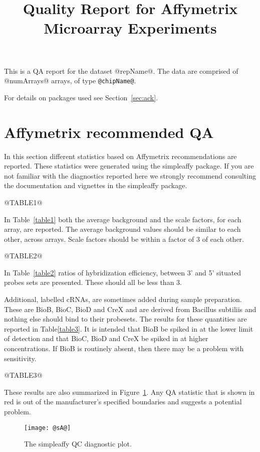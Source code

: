 \documentclass[11pt]{article}
\newcommand{\Rpackage}[1]{{\textsf{#1}}}
\begin{document}
\title{Quality Report for Affymetrix Microarray Experiments}

\maketitle

This is a QA report for the dataset @repName@.
The data are comprised of @numArrays@ arrays, of type \verb+@chipName@+.

For details on packages used see Section~\ref{sec:ack}.

\section{Affymetrix recommended QA}

In this section different statistics based on Affymetrix recommendations
are reported. These statistics were generated using the \Rpackage{simpleaffy} 
package. If you are not familiar with the diagnostics reported here we
strongly recommend consulting the documentation and vignettes in the
\Rpackage{simpleaffy} package.

@TABLE1@


In Table~\ref{table1} both the average background and the scale 
factors, for each array, are reported.  The average background values should 
be similar to each other, across arrays. Scale factors should be within
a factor of 3 of each other.

@TABLE2@

In Table~\ref{table2} ratios of hybridization efficiency, between 3' and
5' situated probes sets are presented. These should all be less than 3.

Additional, labelled cRNAs, are sometimes added during sample preparation. 
These are BioB, BioC, BioD and CreX and are derived from Bacillus subtiliis 
and nothing else should bind to their probesets. The results for these
quantities are reported in Table\ref{table3}. It is intended that BioB be spiked
in at the lower limit of detection and that BioC, BioD and CreX be
spiked in at higher concentrations. If BioB is routinely absent, then there
may be a problem with sensitivity.

@TABLE3@

These results are also summarized in Figure~\ref{fig:sA}. Any QA statistic
that is shown in red is out of the manufacturer's specified boundaries
and suggests a potential problem.


\begin{figure}[tp]
  \centering
\texttt{[image: @sA@]}

\caption{\label{fig:sA}%
The \Rpackage{simpleaffy} QC diagnostic plot.}
\end{figure}
\end{document}
